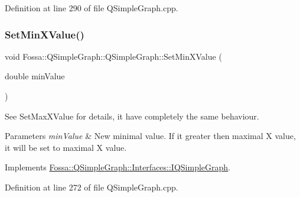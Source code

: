 Definition at line 290 of file Q\+Simple\+Graph.\+cpp.

\mbox{\label{class_fossa_1_1_q_simple_graph_1_1_q_simple_graph_a0eef21e58d8c85f6083d73857f871639}} 
\subsubsection{\texorpdfstring{Set\+Min\+X\+Value()}{SetMinXValue()}}
{\footnotesize\ttfamily void Fossa\+::\+Q\+Simple\+Graph\+::\+Q\+Simple\+Graph\+::\+Set\+Min\+X\+Value (\begin{DoxyParamCaption}\item[{double}]{min\+Value }\end{DoxyParamCaption})\hspace{0.3cm}{\ttfamily [virtual]}}



See Set\+Max\+X\+Value for details, it have completely the same behaviour. 


\begin{DoxyParams}{Parameters}
{\em min\+Value} & New minimal value. If it greater then maximal X value, it will be set to maximal X value. \\
\hline
\end{DoxyParams}


Implements \hyperlink{class_fossa_1_1_q_simple_graph_1_1_interfaces_1_1_i_q_simple_graph_a4266725f87b306e572ad1ae37cfab4ef}{Fossa\+::\+Q\+Simple\+Graph\+::\+Interfaces\+::\+I\+Q\+Simple\+Graph}.



Definition at line 272 of file Q\+Simple\+Graph.\+cpp.

\mbox{\label{class_fossa_1_1_q_simple_graph_1_1_q_simple_graph_a8bf9aac5856a659eb89abffca7750df0}} 

